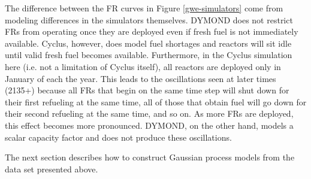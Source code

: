 The difference between the FR curves in Figure \ref{gwe-simulators} come
from modeling differences in the simulators themselves. DYMOND does not 
restrict FRs from operating once they are deployed even if fresh fuel is not 
immediately available. Cyclus, however, does model fuel shortages and 
reactors will sit idle until valid fresh fuel becomes available. Furthermore, 
in the Cyclus simulation here (i.e. not a limitation of Cyclus itself), 
all reactors are deployed only in January of each the year.
This leads to the oscillations seen at later times (2135+) because all 
FRs that begin on the same time step will shut down for their first
refueling at the same time, all of those that obtain fuel will go down for 
their second refueling at the same time, and so on. As more FRs are deployed, 
this effect becomes more pronounced. DYMOND, on the other hand, models a 
scalar capacity factor and does not produce these oscillations.

The next section describes how to
construct Gaussian process models from the data set presented above.

\clearpage
